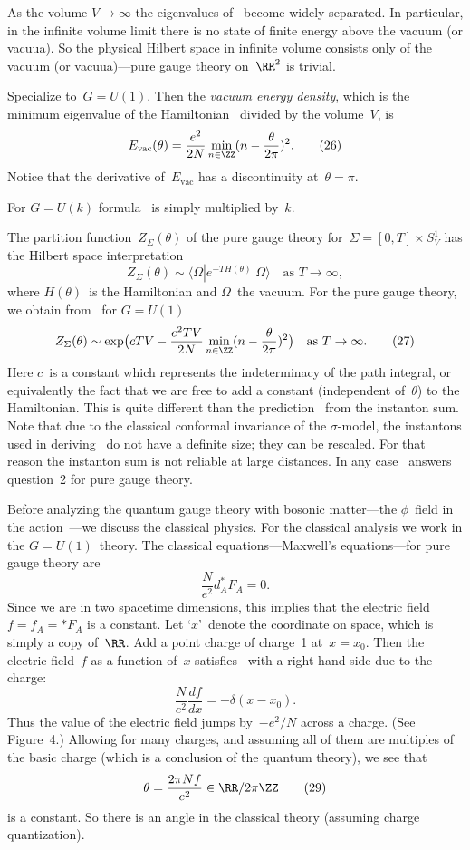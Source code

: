 As the volume $V\to\infty $ the eigenvalues of~ become widely
separated.  In particular, in the infinite volume limit there is no state of
finite energy above the vacuum (or vacuua).  So the physical Hilbert space in
infinite volume consists only of the vacuum (or vacuua)---pure gauge theory
on~$\RR^2$ is trivial.

Specialize to~$G=U(1)$.  Then the {\it vacuum energy density\/}, which is the
minimum eigenvalue of the Hamiltonian~ divided by the volume~$V$,
is 
  $$ E_{\text{vac}}(\theta ) = \frac{e^2}{2N}\min\limits_{n\in
     \ZZ}(n-\frac{\theta }{2\pi })^2. \tag{26} $$
Notice that the derivative of~$E_{\text{vac}}$ has a discontinuity at~$\theta
=\pi $.   
 
For $G=U(k)$ formula~ is simply multiplied by~$k$. 
 
The partition function~$Z_{\Sigma }(\theta )$ of the pure gauge theory
for~$\Sigma =[0,T]\times S^1_V$ has the Hilbert space interpretation
  $$ Z_\Sigma(\theta ) \sim \langle \Omega |e^{-TH(\theta )}|\Omega
     \rangle\quad \text{as $T\to\infty$},  $$
where $H(\theta )$~is the Hamiltonian and $\Omega $~the vacuum.  For the pure
gauge theory, we obtain from~ for $G=U(1)$
  $$ Z_\Sigma(\theta ) \sim \exp\bigl(cTV - \frac{e^2TV}{2N}\min\limits_{n\in
     \ZZ}(n-\frac{\theta }{2\pi })^2 \bigr)\quad \text{as
     $T\to\infty$}. \tag{27} $$
Here $c$~is a constant which represents the indeterminacy of the path
integral, or equivalently the fact that we are free to add a constant
(independent of~$\theta $) to the Hamiltonian.  This is quite different than
the prediction~ from the instanton sum.  Note that due to the
classical conformal invariance of the $\sigma $-model, the instantons used in
deriving~ do not have a definite size; they can be rescaled.  For
that reason the instanton sum is not reliable at large distances.  In any
case ~answers question~2 for pure gauge theory.


Before analyzing the quantum gauge theory with bosonic matter---the $\phi
$~field in the action~---we discuss the classical physics.  For
the classical analysis we work in the $G=U(1)$~theory.  The classical
equations---Maxwell's equations---for pure gauge theory are
  $$ \frac{N}{e^2}d^*_AF_A=0. \tag{28} $$
Since we are in two spacetime dimensions, this implies that the electric
field~$f=f_A=*F_A$ is a constant.  Let `$x$'~denote the coordinate on space,
which is simply a copy of~$\RR$.  Add a point charge of charge~1 at~$x=x_0$.
Then the electric field~$f$ as a function of~$x$ satisfies~ with a
right hand side due to the charge:
  $$ \frac{N}{e^2}\frac{df}{dx}=-\delta (x-x_0).  $$
Thus the value of the electric field jumps by~$-e^2/N$ across a charge.
(See Figure~4.)  Allowing for many charges, and assuming all of them are
multiples of the basic charge (which is a conclusion of the quantum theory),
we see that
  $$ \theta =\frac{2\pi Nf}{e^2}\in \RR/2\pi \ZZ \tag{29} $$
is a constant.  So there is an angle in the classical theory (assuming charge
quantization).

